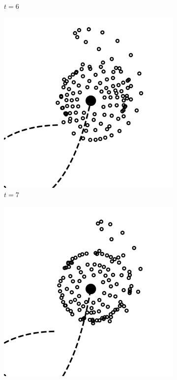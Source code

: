 \documentclass[11pt,twocolumn]{article}
\begin{document}
\begin{figure}[!htbp]
\begin{subfigure}[b]{0.2\textwidth}
    				\caption{$t = 6$}
  			\end{subfigure}
            \hfill
            \begin{subfigure}[b]{0.2\textwidth}
    			\includegraphics[width=\textwidth]{fig_1/Fig3_7_000000_0.pdf}
    				\caption{$t = 7$}
  			\end{subfigure}
            \hfill
            \begin{subfigure}[b]{0.2\textwidth}
    			\includegraphics[width=\textwidth]{fig_1/Fig3_8_000000_0.pdf}

\end{subfigure}
\end{figure}
\end{document}
